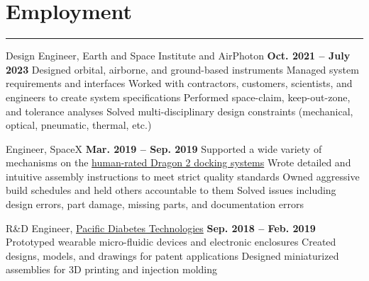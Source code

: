 \vfill
\section{Employment}
\noindent\rule{\textwidth}{\hlinewidth}

\begin{innerlist}
    \item Design Engineer, Earth and Space Institute and AirPhoton
		\hfill\textbf{Oct. 2021 -- July 2023}
        \subitem Designed orbital, airborne, and ground-based instruments
        \subitem Managed system requirements and interfaces
        \subitem Worked with contractors, customers, scientists, and engineers to create system specifications
        \subitem Performed space-claim, keep-out-zone, and tolerance analyses 
        \subitem Solved multi-disciplinary design constraints (mechanical, optical, pneumatic, thermal, etc.)
	\item Engineer, SpaceX 
		\hfill\textbf{Mar. 2019 -- Sep. 2019}
		\subitem Supported a wide variety of mechanisms on the 
            \href{https://en.wikipedia.org/wiki/Dragon_2}{human-rated Dragon 2 docking systems}
		\subitem Wrote detailed and intuitive assembly instructions to meet strict quality standards
		\subitem Owned aggressive build schedules and held others accountable to them
		\subitem Solved issues including design errors, part damage, missing parts, and documentation errors
    \item R\&D Engineer, \href{http://pacificdt.com/}{Pacific Diabetes Technologies} 
		\hfill\textbf{Sep. 2018 -- Feb. 2019} %
        \subitem Prototyped wearable micro-fluidic devices and electronic enclosures
		\subitem Created designs, models, and drawings for patent applications
		\subitem Designed miniaturized assemblies for 3D printing and injection molding
\end{innerlist}

